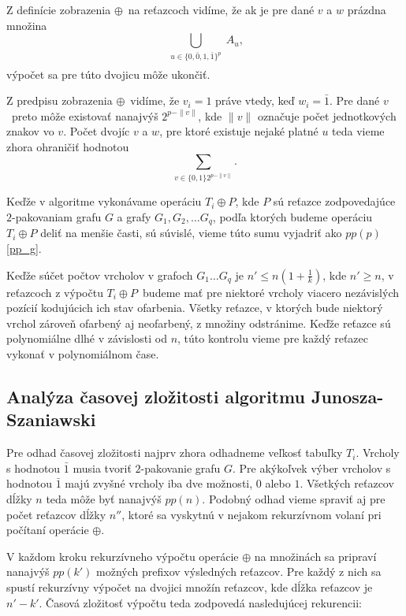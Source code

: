 Z definície zobrazenia $\oplus$ na reťazcoch vidíme, že ak je pre dané $v$ a $w$ prázdna množina
$$ \bigcup_{\substack{u \in \{0, \bar{0}, 1, \bar{1}\}^p \\ [u \oplus v = w] }} A_u,$$
výpočet sa pre túto dvojicu môže ukončiť.

Z predpisu zobrazenia $\oplus$ vidíme, že $v_i = 1$ práve vtedy, keď $w_i = \bar{1}$. Pre dané
$v$ preto môže existovať nanajvýš $2^{p - \|v\|}$, kde $\|v\|$ označuje počet jednotkových znakov
vo $v$. Počet dvojíc $v$ a $w$, pre ktoré existuje nejaké platné $u$ teda vieme zhora ohraničiť
hodnotou
$$\sum_{v \in \{0, 1\} 2^{p - \|v\|}}.$$

Keďže v algoritme vykonávame operáciu $T_i \oplus P$, kde $P$ sú reťazce zodpovedajúce
$2$-pakovaniam grafu $G$ a grafy $G_1, G_2, \ldots G_q$, podľa ktorých budeme operáciu $T_i \oplus P$
deliť na menšie časti, sú súvislé, vieme túto sumu vyjadriť ako $pp(p)$\ref{pp_g}.

Keďže súčet počtov vrcholov v grafoch $G_1 \ldots G_q$ je $n' \leq n(1 + \frac{1}{k})$, kde
$n' \ge n$, v reťazcoch z výpočtu $T_i \oplus P$ budeme mať pre niektoré vrcholy viacero
nezávislých pozícií kodujúcich ich stav ofarbenia. Všetky reťazce, v ktorých bude niektorý
vrchol zároveň ofarbený aj neofarbený, z množiny odstránime. Keďže reťazce sú polynomiálne
dlhé v závislosti od $n$, túto kontrolu vieme pre každý reťazec vykonať v polynomiálnom čase.

\subsection{Analýza časovej zložitosti algoritmu Junosza-Szaniawski}

Pre odhad časovej zložitosti najprv zhora odhadneme veľkosť tabuľky $T_i$.
Vrcholy s hodnotou $\bar{1}$ musia tvoriť $2$-pakovanie grafu $G$. Pre akýkoľvek
výber vrcholov s hodnotou $\bar{1}$ majú zvyšné vrcholy iba dve možnosti, $0$ alebo $1$. Všetkých
reťazcov dĺžky $n$ teda môže byť nanajvýš $pp(n)$. Podobný odhad vieme spraviť aj
pre počet reťazcov dĺžky $n''$, ktoré sa vyskytnú v nejakom rekurzívnom volaní pri
počítaní operácie $\oplus$.

V každom kroku rekurzívneho výpočtu operácie $\oplus$ na množinách sa pripraví nanajvýš
$pp(k')$ možných prefixov výsledných reťazcov. Pre každý z nich sa spustí rekurzívny
výpočet na dvojici množín reťazcov, kde dĺžka reťazcov je $n' - k'$. Časová zložitosť
výpočtu teda zodpovedá nasledujúcej rekurencii:

